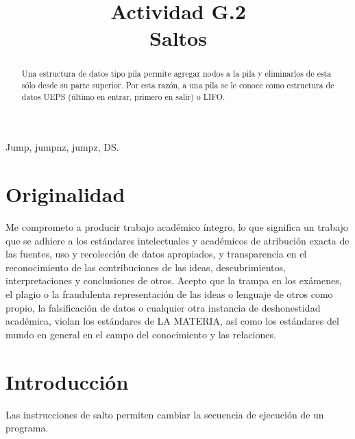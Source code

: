 \documentclass[conference]{IEEEtran}
\begin{document}
\title{Actividad G.2\\Saltos
}

\author{
}
\onecolumn

\maketitle

\begin{abstract}
Una estructura de datos tipo pila permite agregar nodos a la pila y eliminarlos de esta sólo desde su parte superior. Por esta razón, a una pila se le conoce como estructura de datos UEPS (último en entrar, primero en salir) o LIFO.
\end{abstract}

\begin{IEEEkeywords}
\begin{center}
Jump, jumpnz, jumpz, DS.
\end{center}
\end{IEEEkeywords}

\section{Originalidad}

Me comprometo a producir trabajo académico íntegro, lo que significa un trabajo que se adhiere a los estándares intelectuales y académicos de atribución exacta de las fuentes, uso y recolección de datos apropiados, y transparencia en el reconocimiento de las contribuciones de las ideas, descubrimientos, interpretaciones y conclusiones de otros.
Acepto que la trampa en los exámenes, el plagio o la fraudulenta representación de las ideas o lenguaje de otros como propio, la falsificación de datos o cualquier otra instancia de deshonestidad académica, violan los estándares de LA MATERIA, así como los estándares del mundo en general en el campo del conocimiento y las relaciones.

\section{Introducción}
\begin{center}
Las instrucciones de salto permiten cambiar la secuencia de ejecución de un programa.
\end{center}
\end{document}
